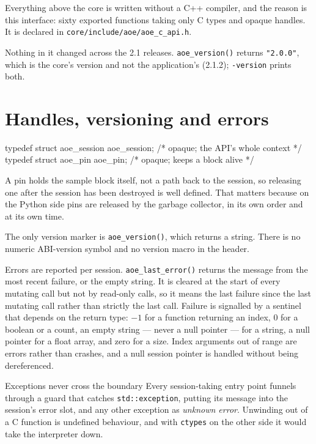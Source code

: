 \documentclass[11pt,a4paper,oneside]{report}
\newcommand{\appver}{2.1.2}
\newcommand{\code}[1]{\texttt{#1}}
\begin{document}
Everything above the core is written without a C++ compiler, and the reason is
this interface: sixty exported functions taking only C types and opaque handles.
It is declared in \code{core/include/aoe/aoe\_c\_api.h}.

Nothing in it changed across the 2.1 releases. \code{aoe\_version()} returns
\code{"2.0.0"}, which is the core's version and not the application's
(\appver); \code{-version} prints both.

\section{Handles, versioning and errors}

\begin{aoecode}
typedef struct aoe_session aoe_session;   /* opaque; the API's whole context */
typedef struct aoe_pin     aoe_pin;       /* opaque; keeps a block alive */
\end{aoecode}

A pin holds the sample block itself, not a path back to the session, so
releasing one after the session has been destroyed is well defined. That matters
because on the Python side pins are released by the garbage collector, in its
own order and at its own time.

The only version marker is \code{aoe\_version()}, which returns a string. There
is no numeric ABI-version symbol and no version macro in the header.

Errors are reported per session. \code{aoe\_last\_error()} returns the message
from the most recent failure, or the empty string. It is cleared at the start of
every mutating call but not by read-only calls, so it means the last failure
since the last mutating call rather than strictly the last call. Failure is
signalled by a sentinel that depends on the return type: $-1$ for a function
returning an index, 0 for a boolean or a count, an empty string --- never a null
pointer --- for a string, a null pointer for a float array, and zero for a size.
Index arguments out of range are errors rather than crashes, and a null session
pointer is handled without being dereferenced.

\begin{aoenote}{Exceptions never cross the boundary}
Every session-taking entry point funnels through a guard that catches
\code{std::exception}, putting its message into the session's error slot, and
any other exception as \emph{unknown error}. Unwinding out of a C function is
undefined behaviour, and with \code{ctypes} on the other side it would take the
interpreter down.
\end{aoenote}
\end{document}
